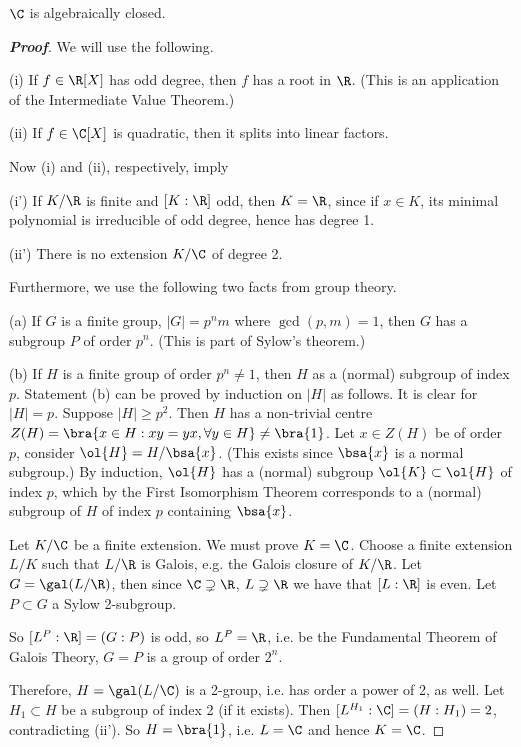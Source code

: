 \begin{theorem}
$\C$ is algebraically closed.
\end{theorem}

\begin{proof}[\bf Proof]
We will use the following.
\ben
\item [(i)] If $f \in \R[X]$ has odd degree, then $f$ has a root in $\R$. (This is an application of the Intermediate Value Theorem.)
\item [(ii)] If $f \in \C[X]$ is quadratic, then it splits into linear factors.
\een

Now (i) and (ii), respectively, imply
\ben
\item [(i')] If $K/\R$ is finite and $[K : \R]$ odd, then $K = \R$, since if $x \in K$, its minimal polynomial is irreducible of odd degree, hence has degree 1.
\item [(ii')] There is no extension $K/\C$ of degree 2.
\een

Furthermore, we use the following two facts from group theory.
\ben
\item [(a)] If $G$ is a finite group, $|G| = p^nm$ where $\gcd(p,m) = 1$, then $G$ has a subgroup $P$ of order $p^n$. (This is part of Sylow's theorem.)
\item [(b)] If $H$ is a finite group of order $p^n \neq 1$, then $H$ as a (normal) subgroup of index $p$.
\een
Statement (b) can be proved by induction on $|H|$ as follows. It is clear for $|H| = p$. Suppose $|H| \geq  p^2$. Then $H$ has a non-trivial centre $Z(H) = \bra{x \in H : xy = yx,\forall y \in H} \neq \bra{1}$. Let $x \in Z(H)$ be of order $p$, consider $\ol{H} = H/\bsa{x}$. (This exists since $\bsa{x}$ is a
normal subgroup.) By induction, $\ol{H}$ has a (normal) subgroup $\ol{K} \subset \ol{H}$ of index $p$, which by the First Isomorphism Theorem corresponds
to a (normal) subgroup of $H$ of index $p$ containing $\bsa{x}$.

Let $K/\C$ be a finite extension. We must prove $K = \C$. Choose a finite extension $L/K$ such that $L/\R$ is Galois, e.g. the Galois closure of $K/\R$. Let $G = \gal(L/\R)$, then since $\C \supsetneq \R$, $L \supsetneq \R$ we have that $[L : \R]$ is even. Let $P \subset G$ a Sylow 2-subgroup.

So $[L^P : \R] = (G : P)$ is odd, so $L^P = \R$, i.e. be the Fundamental Theorem of Galois Theory, $G = P$ is a group of order $2^n$.

Therefore, $H =\gal(L/\C)$ is a 2-group, i.e. has order a power of 2, as well. Let $H_1 \subset H$ be a subgroup of index 2 (if it exists). Then $[L^{H_1} : \C] = (H : H_1) = 2$, contradicting (ii'). So $H = \bra{1}$, i.e. $L = \C$ and hence $K = \C$.
\end{proof}


